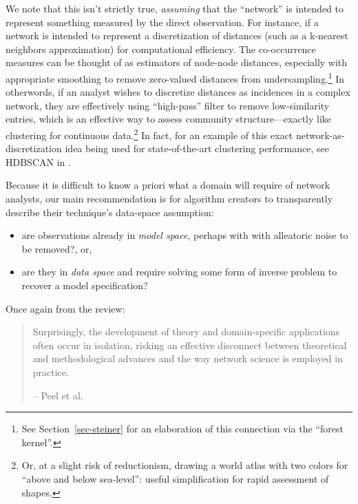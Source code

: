 \documentclass[%
	12pt,
		oneside,
		letterpaper
]{book}
\providecommand{\tightlist}{%
  \setlength{\itemsep}{0pt}\setlength{\parskip}{0pt}}\usepackage{longtable,booktabs,array}
\begin{document}
\doublespacing

We note that this isn't strictly true, \emph{assuming} that the
``network'' is intended to represent something measured by the direct
observation. For instance, if a network is intended to represent a
discretization of distances (such as a k-nearest neighbors
approximation) for computational efficiency. The co-occurrence measures
can be thought of as estimators of node-node distances, especially with
appropriate smoothing to remove zero-valued distances from
undersampling.\footnote{ See Section~\ref{sec-steiner} for an
  elaboration of this connection via the ``forest kernel''.} In
otherwords, if an analyst wishes to discretize distances as incidences
in a complex network, they are effectively using ``high-pass'' filter to
remove low-similarity entries, which is an effective way to assess
community structure---exactly like clustering for continuous
data.\footnote{ Or, at a slight risk of reductionism, drawing a world
  atlas with two colors for ``above and below sea-level'': useful
  simplification for rapid assessment of shapes.} In fact, for an
example of this exact network-as-discretization idea being used for
state-of-the-art clustering performance, see HDBSCAN in
\textcite{HybridApproachHierarchical_Malzer2020}.

Because it is difficult to know a priori what a domain will require of
network analysts, our main recommendation is for algorithm creators to
transparently describe their technique's data-space assumption:

\begin{itemize}
\tightlist
\item
  are observations already in \emph{model space}, perhaps with with
  alleatoric noise to be removed?, or,
\item
  are they in \emph{data space} and require solving some form of inverse
  problem to recover a model specification?
\end{itemize}

Once again from the \textcite{Statisticalinferencelinks_Peel2022}
review:

\singlespacing

\begin{quote}
Surprisingly, the development of theory and domain-specific applications
often occur in isolation, risking an effective disconnect between
theoretical and methodological advances and the way network science is
employed in practice.

\hfill -- Peel et al. \autocite{Statisticalinferencelinks_Peel2022}
\end{quote}
\end{document}
